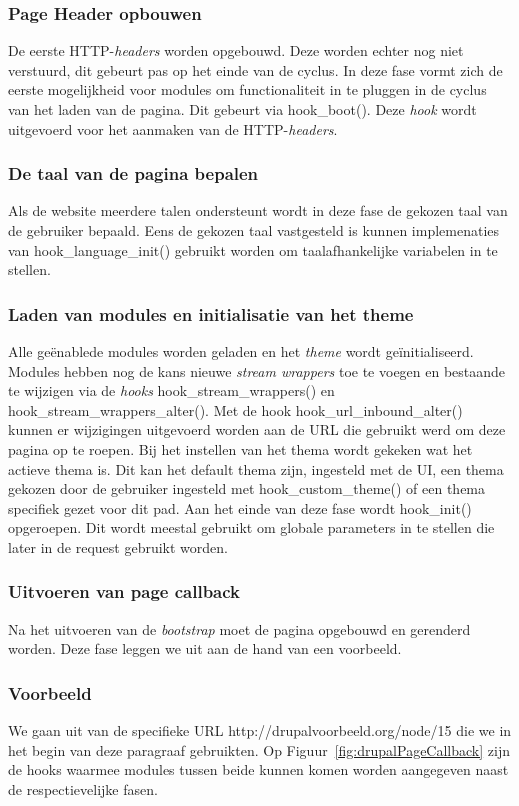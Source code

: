 \subsubsection{Page Header opbouwen}
De eerste HTTP-\textit{headers} worden opgebouwd. Deze worden echter nog niet verstuurd, dit gebeurt pas op het einde van de cyclus. In deze fase vormt zich de eerste mogelijkheid voor modules om functionaliteit in te pluggen in de cyclus van het laden van de pagina. Dit gebeurt via hook\_boot(). Deze \textit{hook} wordt uitgevoerd voor het aanmaken van de HTTP-\textit{headers}.

\subsubsection{De taal van de pagina bepalen}
Als de website meerdere talen ondersteunt wordt in deze fase de gekozen taal van de gebruiker bepaald. Eens de gekozen taal vastgesteld is kunnen implemenaties van hook\_language\_init() gebruikt worden om taalafhankelijke variabelen in te stellen.

\subsubsection{Laden van modules en initialisatie van het theme}
Alle ge\"{e}nablede modules worden geladen en het \textit{theme} wordt ge\"{i}nitialiseerd. Modules hebben nog de kans nieuwe \textit{stream wrappers} toe te voegen en bestaande te wijzigen via de \textit{hooks} hook\_stream\_wrappers() en hook\_stream\_wrappers\_alter(). Met de hook hook\_url\_inbound\_alter() kunnen er wijzigingen uitgevoerd worden aan de URL die gebruikt werd om deze pagina op te roepen. Bij het instellen van het thema wordt gekeken wat het actieve thema is. Dit kan het default thema zijn, ingesteld met de UI, een thema gekozen door de gebruiker ingesteld met hook\_custom\_theme() of een thema specifiek gezet voor dit pad. Aan het einde van deze fase wordt hook\_init() opgeroepen. Dit wordt meestal gebruikt om globale parameters in te stellen die later in de request gebruikt worden.

\subsubsection{Uitvoeren van page callback}
Na het uitvoeren van de \textit{bootstrap} moet de pagina opgebouwd en gerenderd worden. Deze fase leggen we uit aan de hand van een voorbeeld.

\subsubsection{Voorbeeld}
We gaan uit van de specifieke URL http://drupalvoorbeeld.org/node/15 die we in het begin van deze paragraaf gebruikten. Op Figuur~\ref{fig:drupalPageCallback} zijn de hooks waarmee modules tussen beide kunnen komen worden aangegeven naast de respectievelijke fasen.\\

